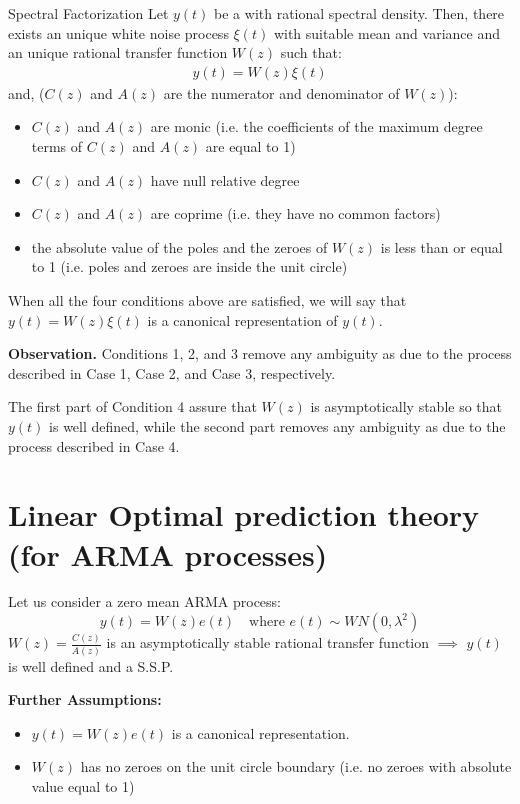 
\begin{theorem}{Spectral Factorization}
	Let $y(t)$ be a \ssp with rational spectral density. 
	Then, there exists an unique white noise process $\xi(t)$ with suitable mean and variance and an unique rational transfer function $W(z)$ such that:
	\begin{align*}
		y(t) = W(z)\xi(t)
	\end{align*}
    and, ($C(z)$ and $A(z)$ are the numerator and denominator of $W(z)$):
    \begin{itemize}
		\item $C(z)$ and $A(z)$ are monic (i.e. the coefficients of the maximum degree terms of $C(z)$ and $A(z)$ are equal to 1)
		\item $C(z)$ and $A(z)$ have null relative degree
		\item $C(z)$ and $A(z)$ are coprime (i.e. they have no common factors) 
		\item the absolute value of the poles and the zeroes of $W(z)$ is less than or equal to 1 (i.e. poles and zeroes are inside the unit circle)
    \end{itemize}
\end{theorem}

When all the four conditions above are satisfied, we will say that $y(t) = W(z)\xi(t)$ is a canonical representation of $y(t)$.

\textbf{Observation.} Conditions 1, 2, and 3 remove any ambiguity as due to the process described in Case 1, Case 2, and Case 3, respectively. 

The first part of Condition 4 assure that $W(z)$ is asymptotically stable so that $y(t)$ is well defined, while the second part removes any ambiguity as due to the process described in Case 4.


\section{Linear Optimal prediction theory (for ARMA processes) }
Let us consider a zero mean ARMA process:
\[
	y(t)=W(z)e(t) \quad \text{where }e(t)\sim W N(0,\lambda^{2} )
\]
$W(z)=\frac{C(z)}{A(z)}$ is an asymptotically stable rational transfer function $\implies$ $y(t)$ is well defined and a S.S.P.

\textbf{Further Assumptions:}
\begin{itemize}
	\item $y(t) =W(z)e(t)$ is a canonical representation.
	\item $W(z)$ has no zeroes on the unit circle boundary (i.e. no zeroes with absolute value equal to 1)
\end{itemize}
 
